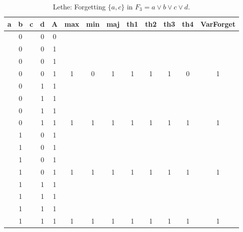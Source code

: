 \begin{table}[!tb]
    \centering
    \begin{tabular}{|c|c|c|c|c|c|c|c|c|c|c|c|c|}
        \hline
        \textbf{a} & \textbf{b} & \textbf{c} & \textbf{d} & \textbf{A} & \textbf{max} & \textbf{min} & \textbf{maj} & \textbf{th1} & \textbf{th2} & \textbf{th3} & \textbf{th4} & \textbf{VarForget} \\ \hline
        \rowcolor{gray!40}  & 0 &  & 0 & 0 &  &  &  &  &  &  &  &  \\ \hline
        \rowcolor{gray!40}  & 0 &  & 0 & 1 &  &  &  &  &  &  &  &  \\ \hline
        \rowcolor{gray!40}  & 0 &  & 0 & 1 &  &  &  &  &  &  &  &  \\ \hline
        \rowcolor{gray!40}  & 0 &  & 0 & 1 & 1 & 0 & 1 & 1 & 1 & 1 & 0 & 1 \\ \hline
        \rowcolor{blue!40}  & 0 &  & 1 & 1 &  &  &  &  &  &  &  &  \\ \hline
        \rowcolor{blue!40}  & 0 &  & 1 & 1 &  &  &  &  &  &  &  &  \\ \hline
        \rowcolor{blue!40}  & 0 &  & 1 & 1 &  &  &  &  &  &  &  &  \\ \hline
        \rowcolor{blue!40}  & 0 &  & 1 & 1 & 1 & 1 & 1 & 1 & 1 & 1 & 1 & 1 \\ \hline
        \rowcolor{red!40}  & 1 &  & 0 & 1 &  &  &  &  &  &  &  &  \\ \hline
        \rowcolor{red!40}  & 1 &  & 0 & 1 &  &  &  &  &  &  &  &  \\ \hline
        \rowcolor{red!40}  & 1 &  & 0 & 1 &  &  &  &  &  &  &  &  \\ \hline
        \rowcolor{red!40}  & 1 &  & 0 & 1 & 1 & 1 & 1 & 1 & 1 & 1 & 1 & 1 \\ \hline
        \rowcolor{green!40}  & 1 &  & 1 & 1 &  &  &  &  &  &  &  &  \\ \hline
        \rowcolor{green!40}  & 1 &  & 1 & 1 &  &  &  &  &  &  &  &  \\ \hline
        \rowcolor{green!40}  & 1 &  & 1 & 1 &  &  &  &  &  &  &  &  \\ \hline
        \rowcolor{green!40}  & 1 &  & 1 & 1 & 1 & 1 & 1 & 1 & 1 & 1 & 1 & 1 \\ \hline
    \end{tabular}
    \caption{Lethe: Forgetting $\{a, c\}$ in $F_{3} = a \lor b \lor c \lor d$.}
    \label{tab:lethe-F3-ac}
\end{table}
